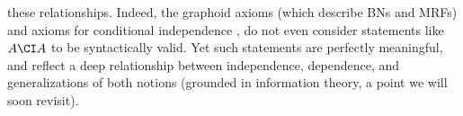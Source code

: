 these relationships.
Indeed, the graphoid axioms (which describe BNs and MRFs) \citep{pearl1987graphoids} and axioms for conditional independence \citep{naumov2013re},
do not even consider statements like $A \CI A$ to be syntactically valid. 
%
Yet such statements are perfectly meaningful,
and reflect a deep relationship between independence, dependence, and generalizations of both notions (grounded in information theory, a point we will soon revisit).

